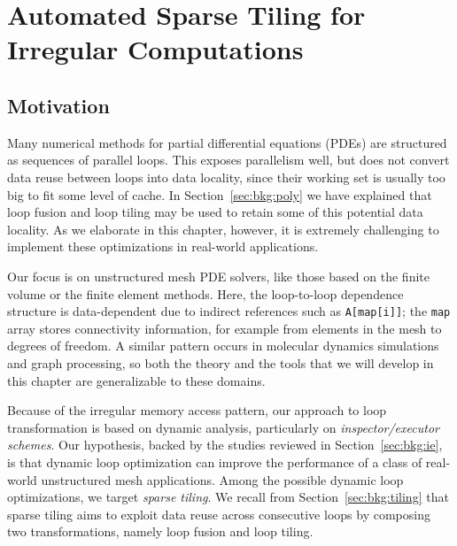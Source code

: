 \chapter{Automated Sparse Tiling for Irregular Computations}
\label{ch:sparsetiling}

\section{Motivation}
\label{sec:tiling:motivation}





Many numerical methods for partial differential equations (PDEs) are structured as sequences of parallel loops. This exposes parallelism well, but does not convert data reuse between loops into data locality, since their working set is usually too big to fit some level of cache. In Section~\ref{sec:bkg:poly} we have explained that loop fusion and loop tiling may be used to retain some of this potential data locality. As we elaborate in this chapter, however, it is extremely challenging to implement these optimizations in real-world applications. 

Our focus is on unstructured mesh PDE solvers, like those based on the finite volume or the finite element methods. Here, the  loop-to-loop dependence structure is data-dependent due to
indirect references such as \texttt{A[map[i]]}; the \texttt{map} array stores connectivity information, for example from elements in the mesh to degrees of freedom. A similar pattern occurs in molecular dynamics simulations and graph processing, so both the theory and the tools that we will develop in this chapter are generalizable to these domains. 

Because of the irregular memory access pattern, our approach to loop transformation is based on dynamic analysis, particularly on \textit{inspector/executor schemes}. Our hypothesis, backed by the studies reviewed in Section~\ref{sec:bkg:ie}, is that dynamic loop optimization can improve the performance of a class of real-world unstructured mesh applications. Among the possible dynamic loop optimizations, we target \textit{sparse tiling}. We recall from Section~\ref{sec:bkg:tiling} that sparse tiling aims to exploit data reuse across consecutive loops by composing two transformations, namely loop fusion and loop tiling. 

